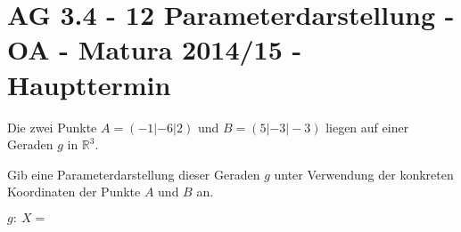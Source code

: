 \section{AG 3.4 - 12 Parameterdarstellung - OA - Matura 2014/15 - Haupttermin}

\begin{beispiel}[AG 3.4]{1} %
Die zwei Punkte $A = (-1| -6|2)$ und $B = (5| -3|-3)$ liegen auf einer Geraden $g$ in $\mathbb{R}^3$. \leer

Gib eine Parameterdarstellung dieser Geraden $g$ unter Verwendung der konkreten Koordinaten
der Punkte $A$ und $B$ an. \leer

$g:~X=$ 
\end{beispiel}